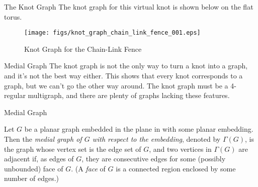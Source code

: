 \documentclass{beamer}
\begin{document}
    \begin{frame}{The Knot Graph}
        The knot graph for this virtual knot is shown below on the flat torus.
        \begin{figure}
            \centering
            \texttt{[image: figs/knot\_graph\_chain\_link\_fence\_001.eps]}
            \caption{Knot Graph for the Chain-Link Fence}
            \label{fig:chain_link_fence_knot_graph}
        \end{figure}
    \end{frame}
    \begin{frame}{Medial Graph}
        The knot graph is not the only way to turn a knot into a graph,
        and it's not the best way either. This shows that every knot
        corresponds to a graph, but we can't go the other way around.
        The knot graph must be a 4-regular multigraph, and there are plenty of
        graphs lacking these features.
    \end{frame}
    \begin{frame}{Medial Graph}
    	\begin{definition}
        	Let $G$ be a planar graph embedded in the plane in with some planar embedding.
        	\pause Then the \textit{medial graph of $G$ with respect to the embedding},
        	denoted by $\Gamma(G)$, is the graph whose vertex set is the edge set of $G$, and two vertices
        	in $\Gamma(G)$ are adjacent if, as edges of $G$, they are consecutive edges for some
        	(possibly unbounded) face of $G$. \pause (A \textit{face} of $G$ is a connected region enclosed
        	by some number of edges.)
        \end{definition}
    \end{frame}
\end{document}
